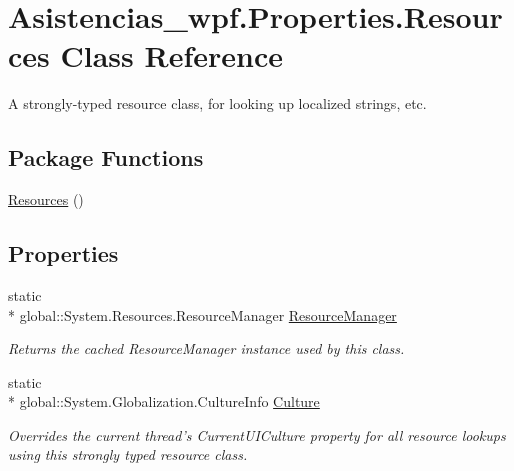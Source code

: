 \hypertarget{class_asistencias__wpf_1_1_properties_1_1_resources}{\section{Asistencias\-\_\-wpf.\-Properties.\-Resources Class Reference}
\label{class_asistencias__wpf_1_1_properties_1_1_resources}
}


A strongly-\/typed resource class, for looking up localized strings, etc.  


\subsection*{Package Functions}
\begin{DoxyCompactItemize}
\item 
\hyperlink{class_asistencias__wpf_1_1_properties_1_1_resources_a28ff40a842cd924d742699097c17971e}{Resources} ()
\end{DoxyCompactItemize}
\subsection*{Properties}
\begin{DoxyCompactItemize}
\item 
static \\*
global\-::\-System.\-Resources.\-Resource\-Manager \hyperlink{class_asistencias__wpf_1_1_properties_1_1_resources_a86d17a0f8966f64f001f0edaf956dfc0}{Resource\-Manager}
\begin{DoxyCompactList}\small\item\em Returns the cached Resource\-Manager instance used by this class. \end{DoxyCompactList}\item 
static \\*
global\-::\-System.\-Globalization.\-Culture\-Info \hyperlink{class_asistencias__wpf_1_1_properties_1_1_resources_a4f2fb192b65717cb577760722969d43a}{Culture}
\begin{DoxyCompactList}\small\item\em Overrides the current thread's Current\-U\-I\-Culture property for all resource lookups using this strongly typed resource class. \end{DoxyCompactList}\end{DoxyCompactItemize}
